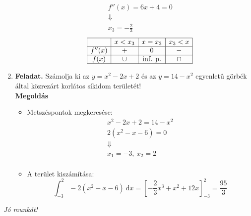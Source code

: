 \documentclass[12pt,a4paper]{article}
\begin{document}
\begin{enumerate}
\begin{itemize}
                    \begin{gather*}
                        f''(x)=6x+4=0\\
                        \Downarrow\\
                        x_3=-\frac{2}{3}
                    \end{gather*}
                    \[
                        \begin{array}{|c|c|c|c|}
                            \hline
                                   & x<x_3 & x=x_3          & x_3<x \\
                            \hline
                            f''(x) & +     & 0              & -     \\
                            \hline
                            f(x)   & \cup  & \text{inf. p.} & \cap  \\
                            \hline
                        \end{array}
                    \]
          \end{itemize}

          \vfill\eject
    \item \textbf{Feladat.} Számolja ki az $y=x^2-2x+2$ és az $y=14-x^2$ egyenletû görbék által közrezárt korlátos síkidom területét!\\
          \textbf{Megoldás}
          \begin{itemize}
              \item Metszéspontok megkeresése:
                    \begin{gather*}
                        x^2-2x+2=14-x^2\\
                        2(x^2-x-6)=0\\
                        \Downarrow\\
                        x_1=-3,\ x_2=2\\
                    \end{gather*}
              \item A terület kiszámítása:
                    \[
                        \displaystyle\int_{-3}^{2}
                        -2(x^2-x-6)\ \mathrm{d}x=\left[-\frac{2}{3}x^3+x^2+12x\right]^2_{-3}=\frac{95}{3}
                    \]
          \end{itemize}

\end{enumerate}

\vspace{0.2cm}
\begin{center}
    \textit{Jó munkát!}
\end{center}
\end{document}
